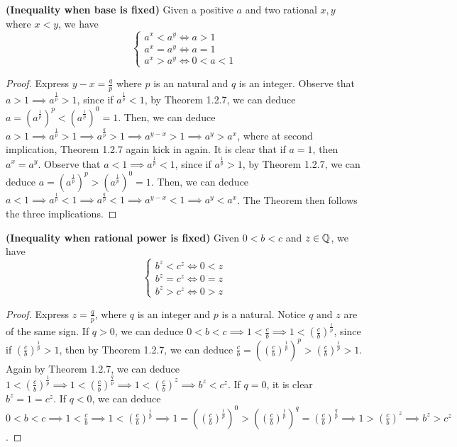 \documentclass{report}
\begin{document}
\begin{theorem}
\textbf{(Inequality when base is fixed)} Given a positive $a$ and two rational  $x,y$ where  $x<y$, we have
 \begin{equation}
\begin{cases}
  a^x<a^y\iff a>1\\
  a^x=a^y\iff a=1\\
  a^x>a^y\iff 0<a<1
\end{cases}
\end{equation}
\end{theorem}
\begin{proof}
Express $y-x=\frac{q}{p}$ where $p$ is an natural and $q$ is an integer. Observe that $a>1\implies a^{\frac{1}{p}}>1$, since if $a^{\frac{1}{p}}<1$, by Theorem 1.2.7, we can deduce $a=(a^{\frac{1}{p}})^p<(a^{\frac{1}{p}})^0=1$. Then, we can deduce $a>1\implies a^{\frac{1}{p}}>1\implies a^{\frac{q}{p}}>1\implies a^{y-x}>1\implies a^y>a^x$, where at second implication, Theorem 1.2.7 again kick in again. It is clear that if $a=1$, then  $a^x=a^y$. Observe that $a<1\implies a^{\frac{1}{p}}<1$, since if $a^{\frac{1}{p}}>1$, by Theorem 1.2.7, we can deduce $a=(a^{\frac{1}{p}})^p>(a^{\frac{1}{p}})^0=1$. Then, we can deduce $a<1\implies a^{\frac{1}{p}}<1\implies a^{\frac{q}{p}}<1\implies a^{y-x}<1\implies a^y<a^x$. The Theorem then follows the three implications.    
\end{proof}
\begin{theorem}
\textbf{(Inequality when rational power is fixed)} Given $0<b<c$ and  $z\in\mathbb{Q}$, we have
\begin{equation}
\begin{cases}
  b^z<c^z \iff 0<z\\
  b^z=c^z \iff 0=z\\
  b^z>c^z\iff 0>z
\end{cases}
\end{equation}
\end{theorem}
\begin{proof}
Express $z=\frac{q}{p}$, where $q$ is an integer and $p$ is a natural. Notice $q\text{ and }z$ are of the same sign. If $q>0$, we can deduce $0<b<c\implies 1<\frac{c}{b}\implies 1<(\frac{c}{b})^{\frac{1}{p}}$, since if $(\frac{c}{b})^{\frac{1}{p}}>1$, then by Theorem 1.2.7, we can deduce $\frac{c}{b}=((\frac{c}{b})^{\frac{1}{p}})^p>(\frac{c}{b})^{\frac{1}{p}}>1$. Again by Theorem 1.2.7, we can deduce $1<(\frac{c}{b})^{\frac{1}{p}}\implies 1<(\frac{c}{b})^{\frac{q}{p}}\implies 1<(\frac{c}{b})^z\implies b^z<c^z$. If $q=0$, it is clear  $b^z=1=c^z$. If $q<0$, we can deduce $0<b<c\implies 1<\frac{c}{b}\implies 1<(\frac{c}{b})^{\frac{1}{p}}\implies 1=((\frac{c}{b})^{\frac{1}{p}})^0 >((\frac{c}{b})^{\frac{1}{p}})^q=(\frac{c}{b})^{\frac{q}{p}}\implies 1>(\frac{c}{b})^z\implies b^z>c^z$. 
\end{proof}
\end{document}
